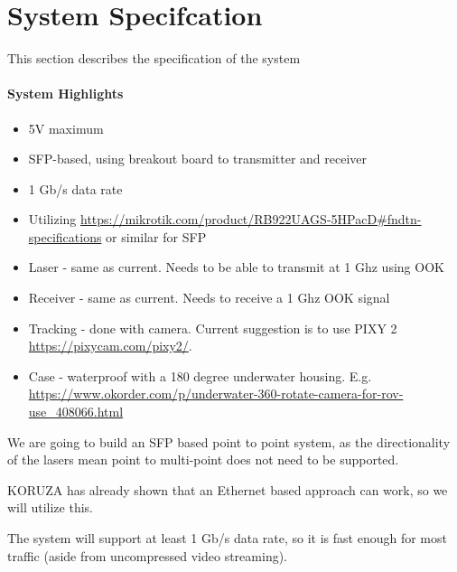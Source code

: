 \section{System Specifcation}
This section describes the specification of the system

\paragraph{\textbf{System Highlights}}
\begin{itemize}
\item{5V maximum}
\item{\ac{SFP}-based, using breakout board to transmitter and receiver}
\item{1 Gb/s data rate}
\item{Utilizing
	\url{https://mikrotik.com/product/RB922UAGS-5HPacD#fndtn-specifications}
	or similar for SFP}
\item{Laser - same as current. Needs to be able to transmit at 1 Ghz using
	\ac{OOK}}
\item{Receiver - same as current. Needs to receive a 1 Ghz \ac{OOK} signal}
\item{Tracking - done with camera. Current suggestion is to use PIXY 2
	\url{https://pixycam.com/pixy2/}.}
\item{Case - waterproof with a 180 degree underwater housing. E.g.
	\url{https://www.okorder.com/p/underwater-360-rotate-camera-for-rov-use_408066.html}}
\end{itemize}

We are going to build an \ac{SFP} based point to point system, as the
directionality of the lasers mean point to multi-point does not need to be
supported.

KORUZA has already shown that an Ethernet based approach can work, so we will
utilize this.

The system will support at least 1 Gb/s data rate, so it is fast enough
for most traffic (aside from uncompressed video streaming).
